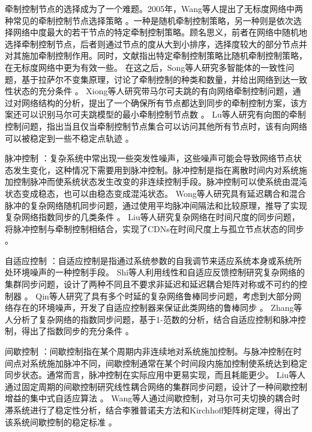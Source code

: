 牵制控制节点的选择成为了一个难题。2005年，Wang等人提出了无标度网络中两种常见的牵制控制节点选择策略 \cite{Wang2002}。一种是随机牵制控制策略，另一种则是依次选择网络中度最大的若干节点的特定牵制控制策略。顾名思义，前者在网络中随机地选择牵制控制节点，后者则通过节点的度从大到小排序，选择度较大的部分节点并对其施加牵制控制作用。同时，文献指出特定牵制控制策略比随机牵制控制策略，在无标度网络中更为有效一些。
在这之后，Song等人研究多智能体的一致性问题，基于拉萨尔不变集原理，讨论了牵制控制的种类和数量，并给出网络到达一致性状态的充分条件 \cite{Song2010}。
Xiong等人研究带马尔可夫跳的有向网络牵制控制问题，通过对网络结构的分析，提出了一个确保所有节点都达到同步的牵制控制方案，该方案还可以识别马尔可夫跳模型的最小牵制控制节点数 \cite{Xiong2010}。
Lu等人研究有向图的牵制控制问题，指出当且仅当牵制控制节点集合可以访问其他所有节点时，该有向网络可以被稳定到一些不稳定点轨迹 \cite{Lu2010}。

脉冲控制 \cite{Lin2016}：复杂系统中常出现一些突发性噪声，这些噪声可能会导致网络节点状态发生变化，这种情况下需要用到脉冲控制。脉冲控制是指在离散时间内对系统施加控制脉冲而使系统状态发生改变的非连续控制手段。脉冲控制可以使系统由混沌状态变成稳态，也可以由稳态变成混沌状态。
Wong等人研究具有延迟耦合和混合脉冲的复杂网络随机同步问题，通过使用平均脉冲间隔法和比较原理，推导了实现复杂网络指数同步的几类条件 \cite{Wong2013}。
Liu等人研究复杂网络在时间尺度的同步问题，将脉冲控制与牵制控制相结合，实现了CDNs在时间尺度上与孤立节点状态的同步 \cite{Liu2016}。

自适应控制 \cite{Ahmed2017}：自适应控制是指通过系统参数的自我调节来适应系统本身或系统所处环境噪声的一种控制手段。
Shi等人利用线性和自适应反馈控制研究复杂网络的集群同步问题，设计了两种不同且不要求非延迟和延迟耦合矩阵对称或不可约的控制器 \cite{Shi2017}。
Qin等人研究了具有多个时延的复杂网络鲁棒同步问题，考虑到大部分网络存在的环境噪声，开发了自适应控制器来保证此类网络的鲁棒同步 \cite{Qin2018}。
Zhang等人分析了复杂网络的指数同步问题，基于1-范数的分析，结合自适应控制和脉冲控制，得出了指数同步的充分条件 \cite{Zhang2018}。

间歇控制 \cite{Liu2016a}：间歇控制指在某个周期内非连续地对系统施加控制。与脉冲控制在时间点对系统施加脉冲不同，间歇控制通常在某个时间段内施加控制使系统达到稳定同步状态。通常而言，脉冲控制在实际应用中更易实现，而且耗能更少。
Liu等人通过固定周期的间歇控制研究线性耦合网络的集群同步问题，设计了一种间歇控制增益的集中式自适应算法 \cite{Liu2015}。
Wang等人通过间歇控制，对马尔可夫切换的耦合时滞系统进行了稳定性分析，结合李雅普诺夫方法和Kirchhoff矩阵树定理，得出了该系统间歇控制的稳定标准 \cite{Wang2018}。

